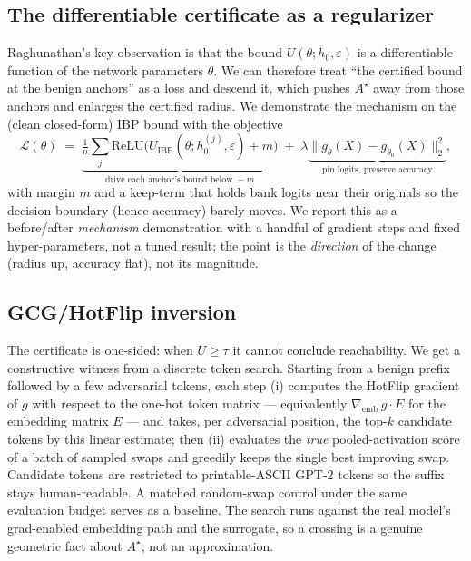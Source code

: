 \subsection{The differentiable certificate as a regularizer}

Raghunathan's key observation is that the bound $U(\theta; h_0, \varepsilon)$ is a
differentiable function of the network parameters $\theta$. We can therefore treat
``the certified bound at the benign anchors'' as a loss and descend it, which pushes
$A^\star$ away from those anchors and enlarges the certified radius. We demonstrate
the mechanism on the (clean closed-form) IBP bound with the objective
\[
\mathcal{L}(\theta) \;=\; \underbrace{\tfrac{1}{n}\sum_{j} \mathrm{ReLU}\!\big(U_{\mathrm{IBP}}(\theta; h_0^{(j)}, \varepsilon) + m\big)}_{\text{drive each anchor's bound below } -m}
\;+\; \lambda \underbrace{\big\| g_\theta(X) - g_{\theta_0}(X) \big\|_2^2}_{\text{pin logits, preserve accuracy}},
\]
with margin $m$ and a keep-term that holds bank logits near their originals so the
decision boundary (hence accuracy) barely moves. We report this as a before/after
\emph{mechanism} demonstration with a handful of gradient steps and fixed
hyper-parameters, not a tuned result; the point is the \emph{direction} of the
change (radius up, accuracy flat), not its magnitude.

\subsection{GCG/HotFlip inversion}

The certificate is one-sided: when $U \ge \tau$ it cannot conclude reachability. We
get a constructive witness from a discrete token search. Starting from a benign
prefix followed by a few adversarial tokens, each step (i) computes the HotFlip
gradient of $g$ with respect to the one-hot token matrix --- equivalently
$\nabla_{\text{emb}}\,g \cdot E$ for the embedding matrix $E$ --- and takes, per
adversarial position, the top-$k$ candidate tokens by this linear estimate; then
(ii) evaluates the \emph{true} pooled-activation score of a batch of sampled swaps
and greedily keeps the single best improving swap. Candidate tokens are restricted
to printable-ASCII GPT-2 tokens so the suffix stays human-readable. A matched
random-swap control under the same evaluation budget serves as a baseline. The
search runs against the real model's grad-enabled embedding path and the surrogate,
so a crossing is a genuine geometric fact about $A^\star$, not an approximation.

